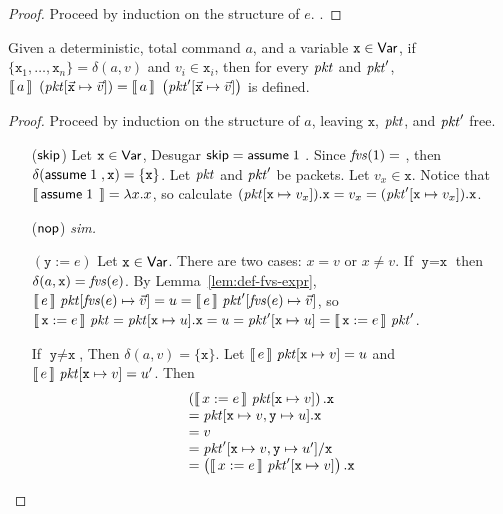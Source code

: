 \begin{proof}
  Proceed by induction on the structure of $e$.  .
\end{proof}

\begin{lemma}
  \label{lem:delta-dom}
  Given a deterministic, total command $a$, and a variable
  $\texttt{x} \in \mathsf{Var}$, if
  $\{\texttt{x}_1, \ldots, \texttt{x}_n\} = \delta(a,v)$ and
  $v_i \in \texttt{x}_i$, then for every $\mathit{pkt}$ and $\mathit{pkt}'$,
  $\llbracket\,a\,\rrbracket~\left(\mathit{pkt}[\vec{\texttt{x}} \mapsto \vec v]\right)
  = \llbracket\,a\,\rrbracket~\left(\mathit{pkt}'[\vec{\texttt{x}} \mapsto \vec v]\right)$
  is defined.
\end{lemma}

\begin{proof}
  Proceed by induction on the structure of $a$, leaving
  $\texttt{x}$, $\mathit{pkt}$, and $\mathit{pkt}'$ free.
  \begin{enumerate}[align=left]
  \item[($\mathsf{skip}$)] Let $\texttt{x} \in \mathsf{Var}$, Desugar
    $\mathsf{skip} = \mathsf{assume}\; 1\;$. Since $\mathit{fvs}(1) = {}$, then
    $\delta(\mathsf{assume}\; 1\;, \texttt{x}) = \{\texttt{x}\}$. Let $\mathit{pkt}$
    and $\mathit{pkt}'$ be packets. Let $v_x \in \texttt{x}$. Notice that
    $\llbracket\,\mathsf{assume}\; 1\;\,\rrbracket = \lambda x.x$, so calculate
    $(\mathit{pkt}[\texttt{x} \mapsto v_x]).\texttt{x} = v_x=
    (\mathit{pkt}'[\texttt{x} \mapsto v_x]).\texttt{x}$.
  \item[($\mathsf{nop}$)] \textit{sim.}
  \item[$(\texttt{y}:=e)$] Let $\texttt{x} \in
    \mathsf{Var}$. There are two cases: $x = v$ or $x \neq v$.  If $\texttt{y}
    = \texttt{x}$ then $\delta(a,\texttt{x}) =
    \mathit{fvs}(e)$. By Lemma~\ref{lem:def-fvs-expr},
    $\llbracket\,e\,\rrbracket~\mathit{pkt}[\mathit{fvs}(e) \mapsto \vec v] = u =
    \llbracket\,e\,\rrbracket~\mathit{pkt}'[\mathit{fvs}(e) \mapsto \vec
    v]$, so $\llbracket\,\texttt{x}:=e\,\rrbracket~\mathit{pkt} = \mathit{pkt}[\texttt{x} \mapsto
    u].\texttt{x} = u = \mathit{pkt}'[\texttt{x} \mapsto u] =
    \llbracket\,\texttt{x}:=e\,\rrbracket~\mathit{pkt}'$.

    If $\texttt{y} \neq \texttt{x}$, Then
    $\delta(a,v) = \{\texttt{x}\}$. Let
    $\llbracket\,e\,\rrbracket~\mathit{pkt}[\texttt{x} \mapsto v] = u$ and
    $\llbracket\,e\,\rrbracket~\mathit{pkt}[\texttt{x} \mapsto v] = u'$. Then
    \[\begin{array}l
        \left(\bracbb{x:=e}~\pkt[\texttt{x} \mapsto v]\right).\texttt{x}\\
        = \pkt[\texttt{x} \mapsto v,\texttt{y} \mapsto u].\texttt{x} \\
        = v \\
        = \pkt'[\texttt{x}\mapsto v, \texttt{y}\mapsto u']/\texttt{x} \\
        = \left(\bracbb{x:=e}~\pkt'[\texttt{x} \mapsto v]\right).\texttt{x}
      \end{array}\]


\end{enumerate}
\end{proof}
